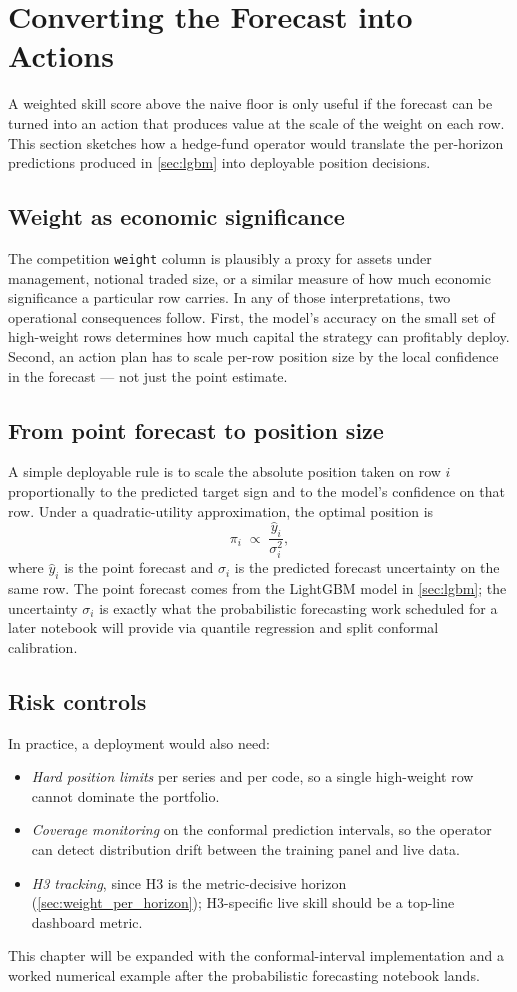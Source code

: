 \section{Converting the Forecast into Actions}
\label{sec:actions}

A weighted skill score above the naive floor is only useful if the forecast can be turned into an action that produces value at the scale of the weight on each row. This section sketches how a hedge-fund operator would translate the per-horizon predictions produced in \cref{sec:lgbm} into deployable position decisions.

\subsection{Weight as economic significance}

The competition \texttt{weight} column is plausibly a proxy for assets under management, notional traded size, or a similar measure of how much economic significance a particular row carries. In any of those interpretations, two operational consequences follow. First, the model's accuracy on the small set of high-weight rows determines how much capital the strategy can profitably deploy. Second, an action plan has to scale per-row position size by the local confidence in the forecast --- not just the point estimate.

\subsection{From point forecast to position size}

A simple deployable rule is to scale the absolute position taken on row $i$ proportionally to the predicted target sign and to the model's confidence on that row. Under a quadratic-utility approximation, the optimal position is
\[
  \pi_i \;\propto\; \frac{\hat y_i}{\sigma_i^2},
\]
where $\hat y_i$ is the point forecast and $\sigma_i$ is the predicted forecast uncertainty on the same row. The point forecast comes from the LightGBM model in \cref{sec:lgbm}; the uncertainty $\sigma_i$ is exactly what the probabilistic forecasting work scheduled for a later notebook will provide via quantile regression and split conformal calibration.

\subsection{Risk controls}

In practice, a deployment would also need:
\begin{itemize}
  \item \emph{Hard position limits} per series and per code, so a single high-weight row cannot dominate the portfolio.
  \item \emph{Coverage monitoring} on the conformal prediction intervals, so the operator can detect distribution drift between the training panel and live data.
  \item \emph{H3 tracking}, since H3 is the metric-decisive horizon (\cref{sec:weight_per_horizon}); H3-specific live skill should be a top-line dashboard metric.
\end{itemize}

This chapter will be expanded with the conformal-interval implementation and a worked numerical example after the probabilistic forecasting notebook lands.
